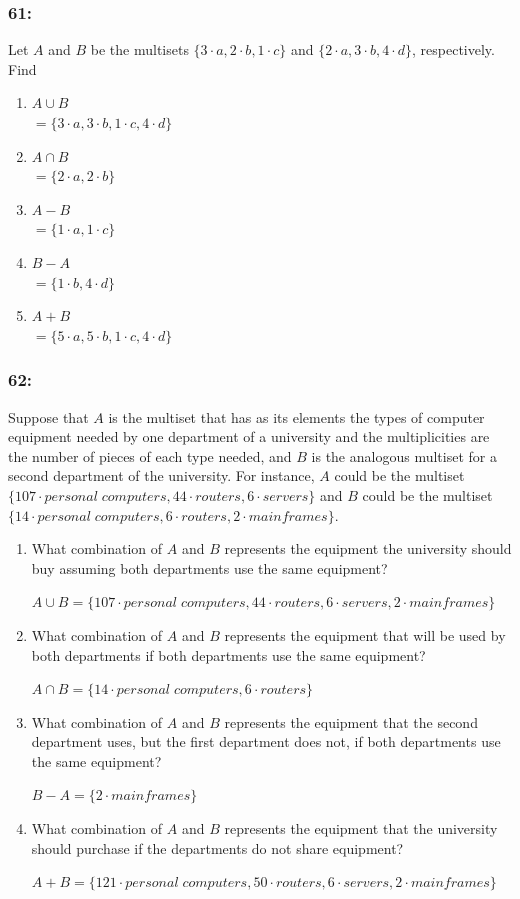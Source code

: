 \documentclass[12pt,en,a4paper]{article}
\begin{document}
	\subsubsection*{61:}
	Let $A$ and $B$ be the multisets $\{3\cdot a,2\cdot b,1\cdot c\}$ and $\{2\cdot a,3\cdot b,4\cdot d\}$, respectively. Find
	\begin{enumerate}[label=\textbf{\alph*)}]
		\item $A\cup B$\\
		$=\{3\cdot a,3\cdot b,1\cdot c,4\cdot d\}$
		\item $A\cap B$\\
		$=\{2\cdot a,2\cdot b\}$
		\item $A-B$\\
		$=\{1\cdot a,1\cdot c\}$
		\item $B-A$\\
		$=\{1\cdot b,4\cdot d\}$
		\item $A+B$\\
		$=\{5\cdot a,5\cdot b,1\cdot c,4\cdot d\}$
	\end{enumerate}
	\subsubsection*{62:}
	Suppose that $A$ is the multiset that has as its elements the types of computer equipment needed by one department of a university and the multiplicities are the number of pieces of each type needed, and $B$ is the analogous multiset for a second department of the university. For instance, $A$ could be the multiset $\{107\cdot personal\;computers,44\cdot routers,6\cdot servers\}$ and $B$ could be the multiset $\{14\cdot personal\;computers, 6\cdot routers,2\cdot mainframes\}$.
	\begin{enumerate}[label=\textbf{\alph*)}]
		\item What combination of $A$ and $B$ represents the equipment the university should buy assuming both departments use the same equipment?
		
		$A\cup B=\{107\cdot personal\;computers,44\cdot routers,6\cdot servers,2\cdot mainframes\}$
		\item What combination of $A$ and $B$ represents the equipment that will be used by both departments if both departments use the same equipment?
		
		$A\cap B=\{14\cdot personal\;computers,6\cdot routers\}$
		\item What combination of $A$ and $B$ represents the equipment that the second department uses, but the first department does not, if both departments use the same equipment?
		
		$B-A=\{2\cdot mainframes\}$
		\item What combination of $A$ and $B$ represents the equipment that the university should purchase if the departments do not share equipment?
		
		$A+B=\{121\cdot personal\;computers,50\cdot routers,6\cdot servers,2\cdot mainframes\}$
	\end{enumerate}
\newpage
{}
\end{document}
